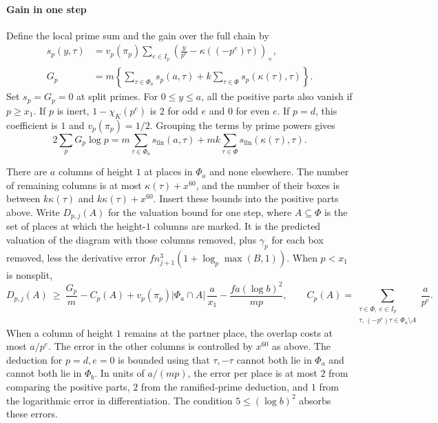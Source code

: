 \paragraph{Gain in one step}
Define the local prime sum and the gain over the full chain by
\begin{align}
 s_p(y,\tau)
  &=v_p(\pi_p)\sum_{e\in I_p}
       \left(\frac{y}{p^e}-\kappa((-p^e)\tau)\right)_+,
       \label{eq:upper-sp}\\
 G_p
  &=m\left\{\sum_{\tau\in\Phi_a}s_p(a,\tau)
           +k\sum_{\tau\in\Phi}s_p(\kappa(\tau),\tau)\right\}.
       \label{eq:upper-gain}
\end{align}
Set \(s_p=G_p=0\) at split primes.
For \(0\le y\le a\), all the positive parts also vanish if \(p\ge x_1\).
If \(p\) is inert, \(1-\chi_K(p^e)\) is \(2\) for odd \(e\) and \(0\)
for even \(e\). If \(p=d\), this coefficient is \(1\) and
\(v_p(\pi_p)=1/2\). Grouping the terms by prime powers gives
\begin{equation}\label{eq:upper-gain-sum}
  2\sum_p G_p\log p =
    m\sum_{\tau\in\Phi_a}s_{\mathrm{fin}}(a,\tau)
       +mk\sum_{\tau\in\Phi}s_{\mathrm{fin}}(\kappa(\tau),\tau).
\end{equation}

There are \(a\) columns of height \(1\) at places in \(\Phi_a\) and none
elsewhere. The number of remaining columns is at most
\(\kappa(\tau)+x^{60}\), and the number of their boxes is between
\(k\kappa(\tau)\) and \(k\kappa(\tau)+x^{60}\).
Insert these bounds into the positive parts above.
Write \(D_{p,j}(A)\) for the valuation bound for one step, where \(A\subseteq\Phi\)
is the set of places at which the height-\(1\) columns are marked.
It is the predicted valuation of the diagram with those columns removed,
plus \(\gamma_p\) for each box removed, less the derivative error
\(f n_{j+1}^3(1+\log_p\max(B,1))\). When \(p<x_1\) is nonsplit,
\begin{equation}\label{eq:upper-one-step}
 D_{p,j}(A)\ \ge\ \frac{G_p}{m}
  - C_p(A)
  +v_p(\pi_p)|\Phi_a\cap A|\,\frac{a}{x_1}
  -\frac{fa(\log b)^2}{mp},
 \qquad
 C_p(A)=\sum_{\substack{\tau\in\Phi,\ e\in I_p\\
                 \tau,\,(-p^e)\tau\in\Phi_a\setminus A}}\frac{a}{p^e}.
\end{equation}
When a column of height \(1\) remains at the partner place, the overlap
costs at most \(a/p^e\).
The error in the other columns is controlled by \(x^{60}\) as above.
The deduction for \(p=d,e=0\) is bounded using that \(\tau,-\tau\)
cannot both lie in \(\Phi_a\) and cannot both lie in \(\Phi_b\).
In units of \(a/(mp)\), the error per place is at most \(2\) from
comparing the positive parts, \(2\) from the ramified-prime deduction,
and \(1\) from the logarithmic error in differentiation.
The condition \(5\le(\log b)^2\) absorbs these errors.

